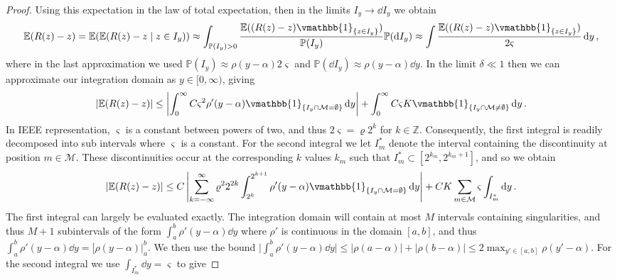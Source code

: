 \documentclass[manuscript,review]{acmart}
\newcommand{\indicatorfn}{\vmathbb{1}}
\begin{document}
\begin{proof}
Using this expectation in the law of total expectation, then in the limits $ I_y \to  \dd{I_y} $ we obtain
\begin{equation*}
\mathbb{E}(R(z) - z)  
=  \mathbb{E}(\mathbb{E}(R(z) - z\mid z\in I_y))  
\approx \int_{\mathbb{P}(I_y) > 0} \dfrac{ \mathbb{E}((R(z) - z)\indicatorfn_{\{z \in I_y\}})}{\mathbb{P}(I_y)} \mathbb{P}(\dd{I_y}) 
\approx \int  \dfrac{ \mathbb{E}((R(z) - z)\indicatorfn_{\{z \in I_y\}})}{2\varsigma}  \dd{y},
\end{equation*}
where in the last approximation we used $ \mathbb{P}(I_y) \approx \rho(y - \alpha) 2\varsigma $ and $ \mathbb{P}(\dd{I_y}) \approx \rho(y - \alpha) \dd{y} $. In the limit $ \delta \ll 1 $ then we can approximate our integration domain as $ y \in  [0, \infty) $, giving
\begin{equation*}
\lvert \mathbb{E}(R(z) - z) \rvert 
\leq 
\left\lvert \int_0^\infty C \varsigma^2 \rho'(y - \alpha) \indicatorfn_{\{I_y\cap \mathcal{M} = \emptyset\}} \dd{y} \right\rvert 
+ \int_0^\infty C \varsigma K \indicatorfn_{\{I_y\cap \mathcal{M} \neq \emptyset\}}\dd{y}.
\end{equation*}
In IEEE representation, $ \varsigma $ is a constant between powers of two, and thus $ 2\varsigma = \varrho 2^k $  for $ k \in \mathbb{Z} $. Consequently, the first integral is readily decomposed into sub intervals where $ \varsigma $ is a constant. For the second integral we let $ I^*_m $ denote the interval containing the discontinuity at position $ m \in \mathcal{M} $. These discontinuities occur at the corresponding $ k $ values $ k_m $ such that $ I^*_m \subset [2^{k_m}, 2^{k_m + 1}] $, and so we obtain
\begin{equation*}
\lvert \mathbb{E}(R(z) - z) \rvert  
\leq C \left\lvert \sum_{k=-\infty}^{\infty} \varrho^2  2^{2k}\int_{2^k}^{2^{k+1}} \rho'(y - \alpha) \indicatorfn_{\{I_y\cap \mathcal{M} = \emptyset\}} \dd{y} \right\rvert 
+ C K \sum_{m \in \mathcal{M}} \varsigma \int_{I^*_m}  \dd{y}. 
\end{equation*}
The first integral can largely be evaluated exactly. The integration domain will contain at most $ M $ intervals containing singularities, and thus $ M+1 $ subintervals of the form $ \int_{a}^{b} \rho'(y-\alpha) \dd{y} $ where $ \rho' $ is continuous in the domain $ [a,b] $, and thus $ \int_{a}^{b} \rho'(y-\alpha) \dd{y} = [\rho(y-\alpha)\rvert_{a}^{b} $. We then use the bound $  \lvert \int_{a}^{b} \rho'(y-\alpha) \dd{y}\rvert \leq \lvert \rho(a-\alpha) \rvert  + \lvert \rho(b-\alpha) \rvert \leq 2 \max_{y'\in[a,b]} \rho(y' - \alpha) $. For the second integral we use $ \int_{I^*_m}  \dd{y} = \varsigma $ to give

\end{proof}
\end{document}
